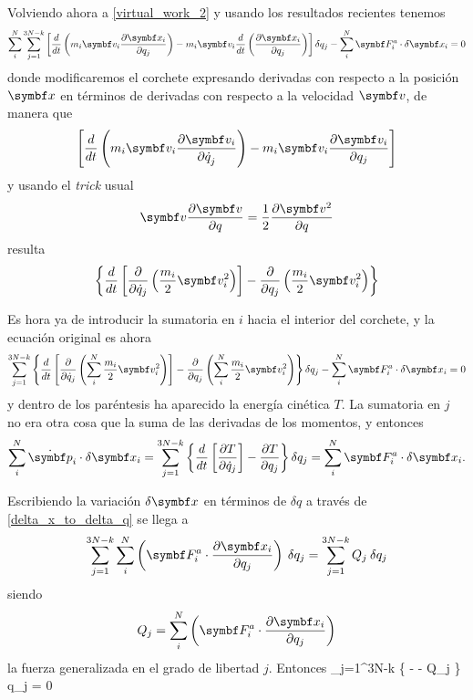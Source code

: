 \documentclass[10pt,oneside]{CBFT_book}
\begin{document}
Volviendo ahora a \eqref{virtual_work_2} y usando los resultados recientes tenemos
\[
	\sum_i^N \sum_{j=1}^{3N-k} 
	\left[ \frac{d}{dt} \left( m_i \vb{v}_i \dpar{\vb{x}_i}{q_j} \right) - 
	m_i \vb{v}_i \frac{d}{dt}\left( \dpar{\vb{x}_i}{q_j} \right) \right] \delta q_j
	- \sum_i^N  \vb{F}_i^a \cdot \delta \vb{x}_i = 0
\]
donde modificaremos el corchete expresando derivadas con respecto a la posición $\vb{x}$ en términos
de derivadas con respecto a la velocidad $\vb{v}$, de manera que 
\[
	\left[ \frac{d}{dt} \left( m_i \vb{v}_i \dpar{\vb{v}_i}{\dot{q}_j} \right) -
	m_i \vb{v}_i \dpar{\vb{v}_i}{q_j} \right]
\]
y usando el {\it trick} usual
\[
	\vb{v} \dpar{\vb{v}}{q} = \frac{1}{2} \dpar{ \vb{v}^2 }{q} 
\]
resulta
\[
	\left\{ 
	\frac{d}{dt} \left[ \frac{\partial}{\partial \dot{q}_j} \left( \frac{m_i}{2} \vb{v}_i^2 \right) \right] - 
	\frac{\partial}{\partial q_j} \left( \frac{m_i}{2} \vb{v}_i^2 \right) \right\}
\]

Es hora ya de introducir la sumatoria en $i$ hacia el interior del corchete, y la ecuación original es ahora 
\[
	\sum_{j=1}^{3N-k} \left\{ 
	\frac{d}{dt} \left[ \frac{\partial}{\partial \dot{q}_j}
	\left( \sum_i^N \frac{m_i}{2} \vb{v}_i^2 \right) \right] 
	- \frac{\partial}{\partial q_j} \left( \sum_i^N \frac{m_i}{2} \vb{v}_i^2 \right) \right\} \delta q_j
	- \sum_i^N  \vb{F}_i^a \cdot \delta \vb{x}_i = 0
\]
y dentro de los paréntesis ha aparecido la energía cinética $T$. La sumatoria en $j$ no era otra cosa que la suma 
de las derivadas de los momentos, y entonces
\[
	\sum_i^N \dot{\vb{p}}_i \cdot \delta \vb{x}_i =
	\sum_{j=1}^{3N-k} \left\{ \frac{d}{dt} \left[ \frac{\partial T}{\partial \dot{q}_j} \right] -
	\frac{\partial T}{\partial q_j} \right\} \delta q_j = \sum_i^N  \vb{F}_i^a \cdot \delta \vb{x}_i.
\]

Escribiendo la variación $\delta\vb{x}$ en términos de $\delta q$ a través de \eqref{delta_x_to_delta_q}
se llega a 
\[
	\sum_{j=1}^{3N-k} \sum_i^N \left( \vb{F}_i^a \cdot \dpar{\vb{x}_i}{q_j} \right) \: \delta q_j =  
	\sum_{j=1}^{3N-k} Q_j \: \delta q_j
\]
siendo 
\[
	Q_j = \sum_i^N \left( \vb{F}_i^a \cdot \dpar{\vb{x}_i}{q_j} \right)
\]
la fuerza generalizada en el grado de libertad $j$. Entonces
\be
	\sum_{j=1}^{3N-k} \left\{ 
	 -  - Q_j \right\} \delta q_j =  0
	\label{eq_el_0}
\ee
\end{document}
